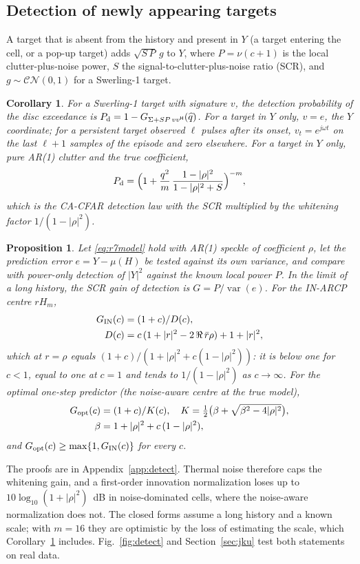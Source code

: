 \documentclass[journal]{IEEEtran}
\newtheorem{proposition}{Proposition}
\newtheorem{corollary}{Corollary}
\begin{document}
\subsection{Detection of newly appearing targets}
A target that is absent from the history and present in $Y$ (a target entering the cell, or a pop-up target) adds $\sqrt{S\,P}\,g$ to $Y$, where $P=\nu(c+1)$ is the local clutter-plus-noise power, $S$ the signal-to-clutter-plus-noise ratio (SCR), and $g\sim\mathcal{CN}(0,1)$ for a Swerling-1 target.
\begin{corollary}\label{cor:detect}
For a Swerling-1 target with signature $v$, the detection probability of the disc exceedance is $P_{\rm d}=1-G_{\Sigma+SP\,vv^{\mathsf H}}(\widehat q)$. For a target in $Y$ only, $v=e$, the $Y$ coordinate; for a persistent target observed $\ell$ pulses after its onset, $v_t=e^{j\omega t}$ on the last $\ell+1$ samples of the episode and zero elsewhere. For a target in $Y$ only, pure AR(1) clutter and the true coefficient,
\begin{equation}
P_{\rm d}=\Big(1+\frac{q^2}{m}\,\frac{1-|\rho|^2}{1-|\rho|^2+S}\Big)^{-m},
\label{eq:pdclosed}
\end{equation}
which is the CA-CFAR detection law with the SCR multiplied by the whitening factor $1/(1-|\rho|^2)$.
\end{corollary}
\begin{proposition}\label{prop:gain}
Let \eqref{eq:r7model} hold with AR(1) speckle of coefficient $\rho$, let the prediction error $e=Y-\mu(H)$ be tested against its own variance, and compare with power-only detection of $|Y|^2$ against the known local power $P$. In the limit of a long history, the SCR gain of detection is $G=P/\operatorname{var}(e)$. For the IN-ARCP centre $rH_m$,
\begin{align}
G_{\rm IN}(c)&=(1+c)/D(c),\label{eq:gin}\\
D(c)&=c\,(1+|r|^2-2\,\Re\,\bar r\rho)+1+|r|^2,\nonumber
\end{align}
which at $r=\rho$ equals $(1+c)/(1+|\rho|^2+c(1-|\rho|^2))$: it is below one for $c<1$, equal to one at $c=1$ and tends to $1/(1-|\rho|^2)$ as $c\to\infty$. For the optimal one-step predictor (the noise-aware centre at the true model),
\begin{align}
G_{\rm opt}(c)&=(1+c)/K(c),\quad K=\tfrac12\big(\beta+\sqrt{\beta^2-4|\rho|^2}\big),\label{eq:gopt}\\
\beta&=1+|\rho|^2+c\,(1-|\rho|^2),\nonumber
\end{align}
and $G_{\rm opt}(c)\ge\max\{1,G_{\rm IN}(c)\}$ for every $c$.
\end{proposition}
The proofs are in Appendix~\ref{app:detect}. Thermal noise therefore caps the whitening gain, and a first-order innovation normalization loses up to $10\log_{10}(1+|\rho|^2)$~dB in noise-dominated cells, where the noise-aware normalization does not. The closed forms assume a long history and a known scale; with $m=16$ they are optimistic by the loss of estimating the scale, which Corollary~\ref{cor:detect} includes. Fig.~\ref{fig:detect} and Section~\ref{sec:jku} test both statements on real data.
\end{document}
